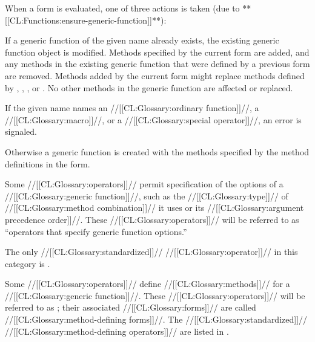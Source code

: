 


When a  form is evaluated, one of three actions is taken (due to **[[CL:Functions:ensure-generic-function]]**):

\beginlist

\itemitem{\bull} If a generic function of the given name already exists, the existing generic function object is modified.  Methods specified by the current  form are added, and any methods in the existing generic function that were defined by a previous  form are removed.  Methods added by the current   form might replace methods defined by ,  , , or .   No other methods in the generic function are affected or replaced.

\itemitem{\bull} If the given name names 
    an //[[CL:Glossary:ordinary function]]//, 
    a  //[[CL:Glossary:macro]]//,
 or a //[[CL:Glossary:special operator]]//,  an error is signaled.

\itemitem{\bull} Otherwise a generic function is created with the methods specified by the method definitions in the  form.

\endlist

Some //[[CL:Glossary:operators]]// permit specification of the options of a //[[CL:Glossary:generic function]]//, such as  the //[[CL:Glossary:type]]// of //[[CL:Glossary:method combination]]// it uses  or its //[[CL:Glossary:argument precedence order]]//. These //[[CL:Glossary:operators]]// will be referred to as ``operators that specify generic function options.'' 

The only //[[CL:Glossary:standardized]]// //[[CL:Glossary:operator]]// in this category is .


Some //[[CL:Glossary:operators]]// define //[[CL:Glossary:methods]]// for a //[[CL:Glossary:generic function]]//. These //[[CL:Glossary:operators]]// will be referred to as ; their associated //[[CL:Glossary:forms]]// are called //[[CL:Glossary:method-defining forms]]//. The //[[CL:Glossary:standardized]]// //[[CL:Glossary:method-defining operators]]// are listed in \thenextfigure.

